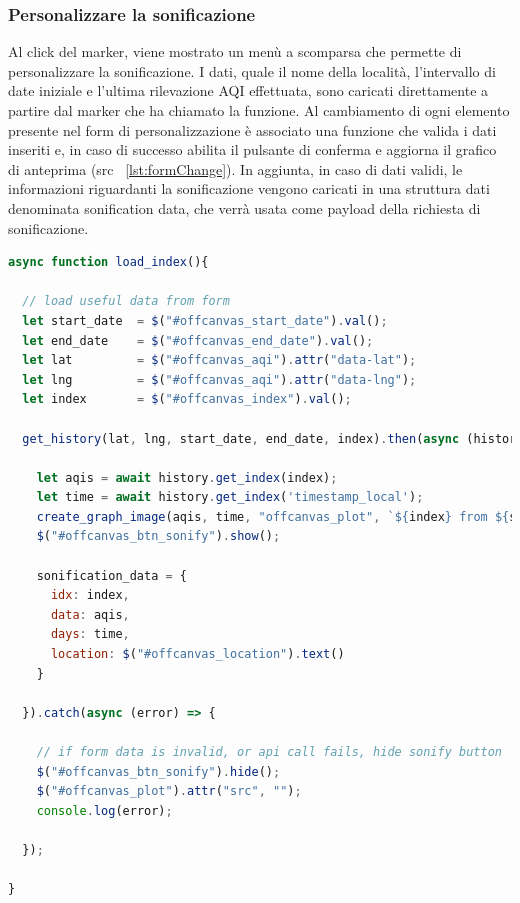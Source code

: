 \subsubsection{Personalizzare la sonificazione}
Al click del marker, viene mostrato un menù a scomparsa che permette di personalizzare la sonificazione.
I dati, quale il nome della località, l'intervallo di date iniziale e l'ultima rilevazione AQI effettuata, sono caricati direttamente a partire dal marker che ha chiamato la funzione.
Al cambiamento di ogni elemento presente nel form di personalizzazione è associato una funzione che valida i dati inseriti e, in caso di successo abilita il pulsante di conferma e aggiorna il grafico di anteprima (src ~\ref{lst:formChange}).
In aggiunta, in caso di dati validi, le informazioni riguardanti la sonificazione vengono caricati in una struttura dati denominata sonification data, che verrà usata come payload della richiesta di sonificazione.

\label{lst:formChange}
\begin{lstlisting}[language=Javascript]
async function load_index(){

  // load useful data from form
  let start_date  = $("#offcanvas_start_date").val();
  let end_date    = $("#offcanvas_end_date").val();
  let lat         = $("#offcanvas_aqi").attr("data-lat");
  let lng         = $("#offcanvas_aqi").attr("data-lng");
  let index       = $("#offcanvas_index").val();
  
  get_history(lat, lng, start_date, end_date, index).then(async (history) => {

    let aqis = await history.get_index(index);
    let time = await history.get_index('timestamp_local');
    create_graph_image(aqis, time, "offcanvas_plot", `${index} from ${start_date} to ${end_date}`);
    $("#offcanvas_btn_sonify").show();

    sonification_data = {
      idx: index,
      data: aqis,
      days: time,
      location: $("#offcanvas_location").text()
    }

  }).catch(async (error) => {
      
    // if form data is invalid, or api call fails, hide sonify button
    $("#offcanvas_btn_sonify").hide();
    $("#offcanvas_plot").attr("src", "");
    console.log(error);

  });

}
\end{lstlisting}

